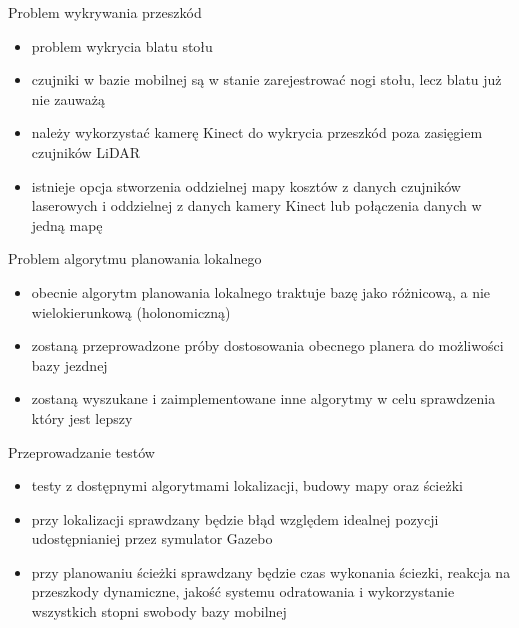 \begin{frame}
{Problem wykrywania przeszkód}
	\begin{itemize}
		\item problem wykrycia blatu stołu
		\item czujniki w bazie mobilnej są w stanie zarejestrować nogi stołu, lecz blatu już nie zauważą
		\item należy wykorzystać kamerę Kinect do wykrycia przeszkód poza zasięgiem czujników LiDAR
		\item istnieje opcja stworzenia oddzielnej mapy kosztów z danych czujników laserowych i oddzielnej z danych kamery Kinect lub połączenia danych w jedną mapę
	\end{itemize}
\end{frame}

\begin{frame}
{Problem algorytmu planowania lokalnego}
	\begin{itemize}
		\item obecnie algorytm planowania lokalnego traktuje bazę jako różnicową, a nie wielokierunkową (holonomiczną)
		\item zostaną przeprowadzone próby dostosowania obecnego planera do możliwości bazy jezdnej
		\item zostaną wyszukane i zaimplementowane inne algorytmy w celu sprawdzenia który jest lepszy
	\end{itemize}
\end{frame}

\begin{frame}
{Przeprowadzanie testów}
	\begin{itemize}
		\item testy z dostępnymi algorytmami lokalizacji, budowy mapy oraz ścieżki
		\item przy lokalizacji sprawdzany będzie błąd względem idealnej pozycji udostępnianiej przez symulator Gazebo
		\item przy planowaniu ścieżki sprawdzany będzie czas wykonania ściezki, reakcja na przeszkody dynamiczne, jakość systemu odratowania i wykorzystanie wszystkich stopni swobody bazy mobilnej
	\end{itemize}
\end{frame}